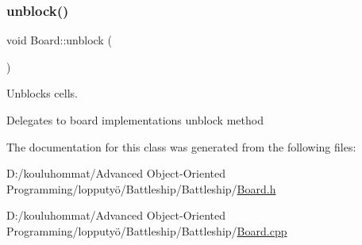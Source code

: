 \subsubsection{\texorpdfstring{unblock()}{unblock()}}
{\footnotesize\ttfamily void Board\+::unblock (\begin{DoxyParamCaption}{ }\end{DoxyParamCaption})}



Unblocks cells. 

Delegates to board implementation\textquotesingle{}s unblock method 

The documentation for this class was generated from the following files\+:\begin{DoxyCompactItemize}
\item 
D\+:/kouluhommat/\+Advanced Object-\/\+Oriented Programming/lopputyö/\+Battleship/\+Battleship/\mbox{\hyperlink{_board_8h}{Board.\+h}}\item 
D\+:/kouluhommat/\+Advanced Object-\/\+Oriented Programming/lopputyö/\+Battleship/\+Battleship/\mbox{\hyperlink{_board_8cpp}{Board.\+cpp}}\end{DoxyCompactItemize}
